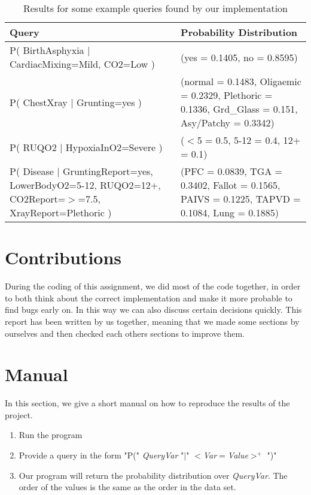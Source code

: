 \documentclass[10pt,a4paper]{article}
\begin{document}
\begin{table}[H]
\begin{tabular}{|p{9cm}|p{7cm}|}
\hline 
\textbf{Query} & \textbf{Probability Distribution} \\ 
\hline 
P( BirthAsphyxia $|$ CardiacMixing=Mild, CO2=Low ) & (yes = 0.1405, no = 0.8595) \\ 
\hline 
P( ChestXray $|$ Grunting=yes ) & (normal = 0.1483, Oligaemic = 0.2329, Plethoric = 0.1336, Grd\_Glass = 0.151, Asy/Patchy = 0.3342) \\ 
\hline 
P( RUQO2 $|$ HypoxiaInO2=Severe ) & ($<$5 = 0.5, 5-12 = 0.4, 12+ = 0.1) \\ 
\hline 
P( Disease $|$ GruntingReport=yes, LowerBodyO2=5-12, RUQO2=12+, CO2Report=$>$=7.5, XrayReport=Plethoric ) & (PFC = 0.0839, TGA = 0.3402, Fallot = 0.1565, PAIVS = 0.1225, TAPVD = 0.1084, Lung = 0.1885) \\ 
\hline 
\end{tabular} 
\caption{Results for some example queries found by our implementation}
\label{tablespiegelhalter}
\end{table}

\section{Contributions}
During the coding of this assignment, we did most of the code together, in order to both think about the correct implementation and make it more probable to find bugs early on. In this way we can also discuss certain decisions quickly. This report has been written by us together, meaning that we made some sections by ourselves and then checked each others sections to improve them.
\section{Manual}
In this section, we give a short manual on how to reproduce the results of the project. 

\begin{enumerate}
\item Run the program
\item Provide a query in the form "P(" \emph{QueryVar} "$|$" $<$\emph{Var}$=$\emph{Value}$>^+$ ")"
\item Our program will return the probability distribution over \emph{QueryVar}. The order of the values is the same as the order in the data set.
\end{enumerate}
\end{document}
